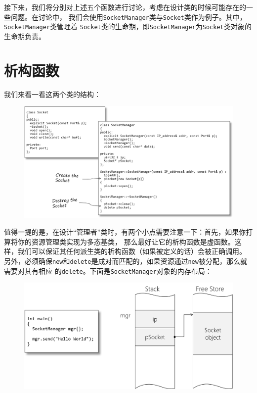 \documentclass[12pt]{article}
\begin{document}
\indent{}接下来，我们将分别对上述五个函数进行讨论，考虑在设计类的时候可能存在的一些问题。在讨论中，
我们会使用\texttt{SocketManager}类与\texttt{Socket}类作为例子。其中，\texttt{SocketManager}类管理着
\texttt{Socket}类的生命期，即\texttt{SocketManager}为\texttt{Socket}类对象的生命期负责。

\section{析构函数}
\noindent{}我们来看一看这两个类的结构：

\begin{figure}[h]
\centering
\includegraphics[width=16cm]{./imgs/image.Y7UIS0.png}
\end{figure}

\indent{}值得一提的是，在设计“管理者”类时，有两个小点需要注意一下：首先，如果你打算将你的资源管理类实现为多态基类，
那么最好让它的析构函数是虚函数。这样，我们可以保证其任何派生类的析构函数（如果被定义的话）会被正确调用。
另外，必须确保\texttt{new}和\texttt{delete}是成对而匹配的，如果资源通过\texttt{new}被分配，那么就需要对其有相应
的\texttt{delete}。下面是\texttt{SocketManager}对象的内存布局：

\begin{figure}[h]
\centering
\includegraphics[width=12cm]{./imgs/image.0V3MS0.png}
\end{figure}
\end{document}
